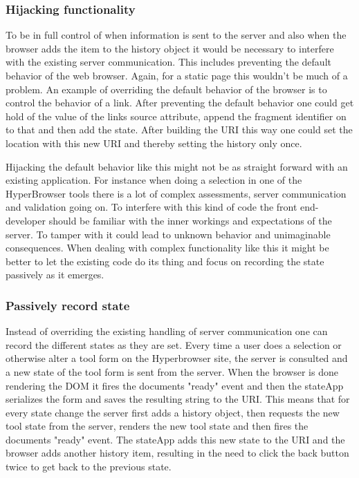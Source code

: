\documentclass[english]{ifimaster}
\begin{document}
\subsubsection{Hijacking functionality}
To be in full control of when information is sent to the server and also when the browser adds the item to the history object it would be necessary to interfere with the existing server communication. This includes preventing the default behavior of the web browser. Again, for a static page this wouldn't be much of a problem. An example of overriding the default behavior of the browser is to control the behavior of a link. After preventing the default behavior one could get hold of the value of the links source attribute, append the fragment identifier on to that and then add the state. After building the URI this way one could set the location with this new URI and thereby setting the history only once. 

Hijacking the default behavior like this might not be as straight forward with an existing application. For instance when doing a selection in one of the HyperBrowser tools there is a lot of complex assessments, server communication and validation going on. To interfere with this kind of code the front end-developer should be familiar with the inner workings and expectations of the server. To tamper with it could lead to unknown behavior and unimaginable consequences. When dealing with complex functionality like this it might be better to let the existing code do its thing and focus on recording the state passively as it emerges.

\subsubsection{Passively record state}
Instead of overriding the existing handling of server communication one can record the different states as they are set. Every time a user does a selection or otherwise alter a tool form on the Hyperbrowser site, the server is consulted and a new state of the tool form is sent from the server. When the browser is done rendering the DOM it fires the documents "ready" event and then the stateApp serializes the form and saves the resulting string to the URI. This means that for every state change the server first adds a history object, then requests the new tool state from the server, renders the new tool state and then fires the documents "ready" event. The stateApp adds this new state to the URI and the browser adds another history item, resulting in the need to click the back button twice to get back to the previous state. 
\end{document}
